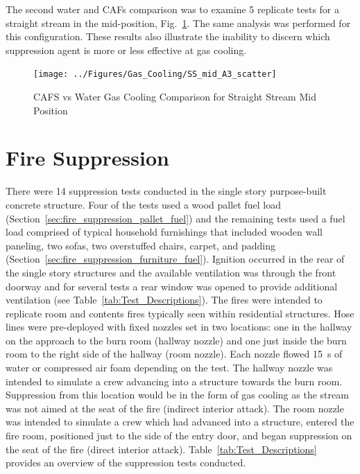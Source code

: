 \documentclass[12pt,oneside]{book}
\begin{document}
The second water and CAFs comparison was to examine 5 replicate tests for a straight stream in the mid-position, Fig.~\ref{fig:CAFS_Water_Comp_SS_mid}. The same analysis was performed for this configuration. These results also illustrate the inability to discern which suppression agent is more or less effective at gas cooling.


\begin{figure}[!ht]
	\texttt{[image: ../Figures/Gas\_Cooling/SS\_mid\_A3\_scatter]}
	\caption{CAFS vs Water Gas Cooling Comparison for Straight Stream Mid Position}
	\label{fig:CAFS_Water_Comp_SS_mid}
\end{figure}

\clearpage

\section{Fire Suppression}
\label{sec:Fire_Suppression}
There were 14 suppression tests conducted in the single story purpose-built concrete structure. Four of the tests used a wood pallet fuel load (Section~\ref{sec:fire_suppression_pallet_fuel}) and the remaining tests used a fuel load comprised of typical household furnishings that included wooden wall paneling, two sofas, two overstuffed chairs, carpet, and padding (Section~\ref{sec:fire_suppression_furniture_fuel}). Ignition occurred in the rear of the single story structures and the available ventilation was through the front doorway and for several tests a rear window was opened to provide additional ventilation (see Table~\ref{tab:Test_Descriptions}). The fires were intended to replicate room and contents fires typically seen within residential structures. Hose lines were pre-deployed with fixed nozzles set in two locations: one in the hallway on the approach to the burn room (hallway nozzle) and one just inside the burn room to the right side of the hallway (room nozzle). Each nozzle flowed 15~s of water or compressed air foam depending on the test. The hallway nozzle was intended to simulate a crew advancing into a structure towards the burn room. Suppression from this location would be in the form of gas cooling as the stream was not aimed at the seat of the fire (indirect interior attack). The room nozzle was intended to simulate a crew which had advanced into a structure, entered the fire room, positioned just to the side of the entry door, and began suppression on the seat of the fire (direct interior attack). Table~\ref{tab:Test_Descriptions} provides an overview of the suppression tests conducted.
\end{document}
